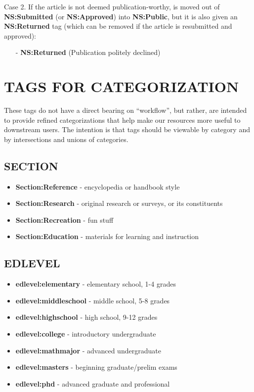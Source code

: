 \documentclass[12pt]{article}
\begin{document}
\noindent Case 2. If the article is not deemed
publication-worthy, is moved out of {\bf NS:Submitted} (or
{\bf NS:Approved}) into {\bf NS:Public}, but it is also
given an {\bf NS:Returned} tag (which can be removed if
the article is resubmitted and approved):

\begin{itemize}
\item[-] {\bf NS:Returned} (Publication politely declined)
\end{itemize}

\section{TAGS FOR CATEGORIZATION}

These tags do not have a direct bearing on ``workflow'', but
rather, are intended to provide refined categorizations
that help make our resources more useful to downstream
users. The intention is that tags should be viewable by
category and by intersections and unions of categories.

\subsection*{SECTION}

\begin{itemize}
\item {\bf Section:Reference} - encyclopedia or handbook style
\item {\bf Section:Research} - original research or surveys, or its constituents
\item {\bf Section:Recreation} - fun stuff
\item {\bf Section:Education} - materials for learning and instruction
\end{itemize}

\subsection*{EDLEVEL}

\begin{itemize}
\item {\bf edlevel:elementary} - elementary school, 1-4 grades
\item {\bf edlevel:middleschool} - middle school, 5-8 grades
\item {\bf edlevel:highschool} - high school, 9-12 grades
\item {\bf edlevel:college} - introductory undergraduate
\item {\bf edlevel:mathmajor} - advanced undergraduate
\item {\bf edlevel:masters} - beginning graduate/prelim exams
\item {\bf edlevel:phd} - advanced graduate and professional
\end{itemize}
\end{document}

